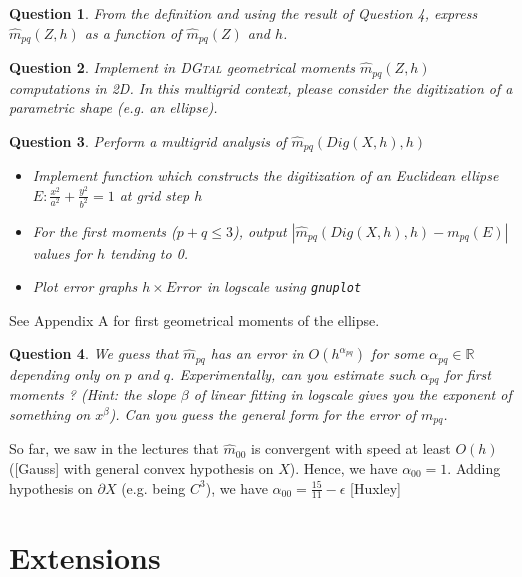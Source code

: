 \documentclass[a4paper, 11pt]{article}
\newtheorem{qu}{Question}
\begin{document}
\begin{qu}
From the definition and using the result of Question 4, express
$\hat{m}_{pq}(Z,h)$ as a function of $\hat{m}_{pq}(Z)$ and $h$.
\end{qu}

\begin{qu}
Implement in \textsc{DGtal} geometrical moments  $\hat{m}_{pq}(Z,h)$
computations in 2D. In this multigrid context, please consider the
digitization of a parametric shape (\emph{e.g.} an ellipse).
\end{qu}



\begin{qu}
	Perform a multigrid analysis of $\hat{m}_{pq}(Dig(X,h), h)$
	 \begin{itemize}
	 \item Implement function which constructs the digitization of
           an Euclidean ellipse $E: \frac{x^2}{a^2} + \frac{y^2}{b^2}
           = 1$ at grid step $h$ 
	 \item For the first moments ($p+q\leq 3$), output $|
           \hat{m}_{pq}(Dig(X,h), h) - m_{pq}(E)|$ values for $h$
           tending to 0.
	 \item Plot error graphs $h\times Error$ in logscale using \texttt{gnuplot}
\end{itemize}	 
\end{qu}	

See Appendix A for first geometrical moments of the ellipse.


\begin{qu} 
We guess that $\hat{m}_{pq}$ has an error in $O(h^{\alpha_{pq}})$ for
some $\alpha_{pq}\in\mathbb{R}$ depending only on $p$ and
$q$. Experimentally, can you estimate such $\alpha_{pq}$ for first
moments ? (Hint: the slope $\beta$ of linear fitting in logscale gives
you the exponent of something on $x^\beta$). Can you guess the general
form for the error of $m_{pq}$.
\end{qu}	

So far, we saw in the lectures that $\hat{m}_{00}$ is convergent with
speed at least $O(h)$ ([Gauss] with general convex hypothesis on
$X$). Hence, we have $\alpha_{00} = 1$. Adding hypothesis on $\partial
X$ (e.g. being $C^3$), we have $\alpha_{00} = \frac{15}{11}-\epsilon$
[Huxley]


\section{Extensions}
\end{document}
